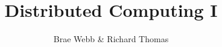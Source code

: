 \documentclass{csse4400}
\title{Distributed Computing I}
\author{Brae Webb \& Richard Thomas}
\date{\week{5}}
\begin{document}
\makecover





\end{document}
